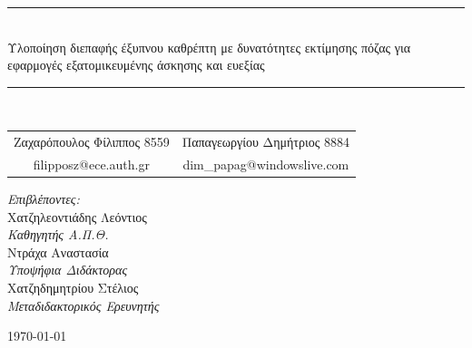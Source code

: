 \begin{titlepage}
\begin{center}
		\rule{\linewidth}{0.5mm}\\[0.5cm]
		
		\LARGE{Υλοποίηση διεπαφής έξυπνου καθρέπτη με δυνατότητες εκτίμησης πόζας για εφαρμογές εξατομικευμένης άσκησης και ευεξίας}
		
		\rule{\linewidth}{0.5mm}\\[2cm]
		
		\large
		\begin{tabular}{c@{\hskip 0.5cm}|@{\hskip 0.5cm}c}
			Ζαχαρόπουλος Φίλιππος 8559 & Παπαγεωργίου Δημήτριος 8884\\
			\small{filipposz@ece.auth.gr} & \small{dim\_papag@windowslive.com}\\
		\end{tabular}
		
		\vfill
		
		\large
		\textsl{Επιβλέποντες:}\\[0.5cm]
		Χατζηλεοντιάδης Λεόντιος\\
		{\normalsize\textsl{Καθηγητής Α.Π.Θ.}}\\[0.4cm]
		Ντράχα Αναστασία\\
		{\normalsize\textsl{Υποψήφια Διδάκτορας}}\\[0.4cm]
		Χατζηδημητρίου Στέλιος\\
		{\normalsize\textsl{Μεταδιδακτορικός Ερευνητής}}\\
		
		\vfill
		
		\large{\today}
	\end{center}
\end{titlepage}
